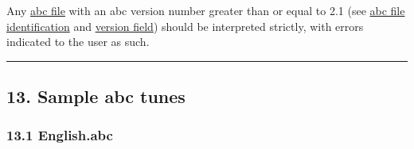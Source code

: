 \documentclass[oneside]{book}
\begin{document}
Any \protect\hyperlink{abc_file_definition}{abc file} with an abc
version number greater than or equal to 2.1 (see
\protect\hyperlink{abc_file_identification}{abc file identification} and
\protect\hyperlink{version_field}{version field}) should be interpreted
strictly, with errors indicated to the user as such.

\begin{center}\rule{0.5\linewidth}{\linethickness}\end{center}

\hypertarget{sample_abc_tunes}{\subsection{13. Sample abc
tunes}\label{sample_abc_tunes}}

\hypertarget{englishabc}{\subsubsection{13.1
English.abc}\label{englishabc}}
\end{document}
